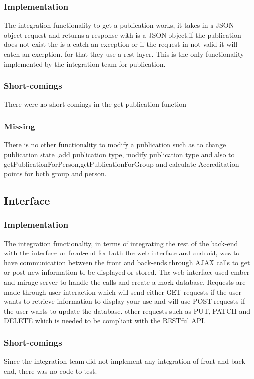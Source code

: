 \documentclass{article}
\begin{document}
        \subsubsection{Implementation}
            The integration functionality to get a publication works, it takes in a JSON object request and returns a response with is a JSON object.if the publication does not exist the is a catch an exception or if the request in not valid it will catch an exception. for that they use a rest layer. This is the only functionality implemented by the integration team for publication.
        \subsubsection{Short-comings}
        There were no short comings in the get publication function
        \subsubsection{Missing}
        There is no other functionality to modify a publication such as to change publication state ,add publication type, modify publication type and also to getPublicationForPerson,getPublicationForGroup and calculate Accreditation points for both group and person.
        
    \subsection{Interface}
        \subsubsection{Implementation}
        The integration functionality, in terms of integrating the rest of the back-end with the interface or front-end for both the web interface and android, was to have communication between the front and back-ends through AJAX calls to get or post new information to be displayed or stored. The web interface used ember and mirage server to handle the calls and create a mock database. Requests are made through user interaction which will send either GET requests if the user wants to retrieve information to display your use and will use POST requests if the user wants to update the database. other requests such as PUT, PATCH and DELETE which is needed to be compliant with the RESTful API.
        \subsubsection{Short-comings}
        Since the integration team did not implement any integration of front and back-end, there was no code to test.
\end{document}
